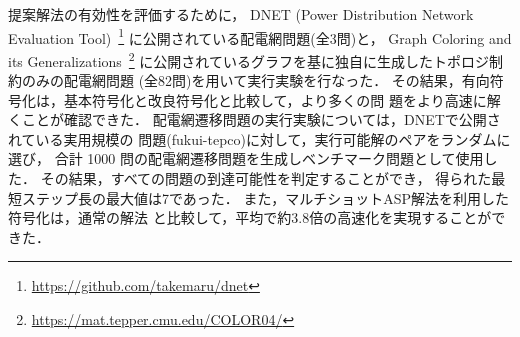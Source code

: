 提案解法の有効性を評価するために，
DNET (Power Distribution Network Evaluation Tool)~\footnote{%
\url{https://github.com/takemaru/dnet}}
に公開されている配電網問題(全3問)と，
Graph Coloring and its Generalizations~\footnote{%
\url{https://mat.tepper.cmu.edu/COLOR04/}}
に公開されているグラフを基に独自に生成したトポロジ制約のみの配電網問題
(全82問)を用いて実行実験を行なった．
その結果，有向符号化は，基本符号化と改良符号化と比較して，より多くの問
題をより高速に解くことが確認できた．
%
配電網遷移問題の実行実験については，DNETで公開されている実用規模の
問題({\sf fukui-tepco})に対して，実行可能解のペアをランダムに選び，
合計 1000 問の配電網遷移問題を生成しベンチマーク問題として使用した．
その結果，すべての問題の到達可能性を判定することができ，
得られた最短ステップ長の最大値は7であった．
また，マルチショットASP解法を利用した符号化は，通常の解法
と比較して，平均で約3.8倍の高速化を実現することができた．


